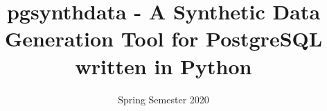 \title  {pgsynthdata - A Synthetic Data Generation Tool for PostgreSQL written in Python}
\addresses  {\groupname\\\deptname\\\univname} 
\date       {Spring Semester 2020}


\maketitle